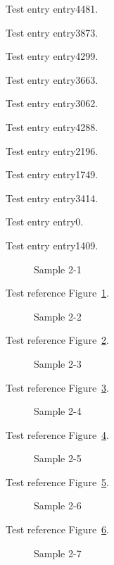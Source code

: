 Test entry \gls{entry4481}.

Test entry \gls{entry3873}.

Test entry \gls{entry4299}.

Test entry \gls{entry3663}.

Test entry \gls{entry3062}.

Test entry \gls{entry4288}.

Test entry \gls{entry2196}.

Test entry \gls{entry1749}.

Test entry \gls{entry3414}.

Test entry \gls{entry0}.

Test entry \gls{entry1409}.

\begin{figure}[tbhp]
\caption{Sample 2-1}
\label{fig:sample-2-1}
\end{figure}

Test reference Figure~\ref{fig:sample-2-1}.

\begin{figure}[tbhp]
\caption{Sample 2-2}
\label{fig:sample-2-2}
\end{figure}

Test reference Figure~\ref{fig:sample-2-2}.

\begin{figure}[tbhp]
\caption{Sample 2-3}
\label{fig:sample-2-3}
\end{figure}

Test reference Figure~\ref{fig:sample-2-3}.

\begin{figure}[tbhp]
\caption{Sample 2-4}
\label{fig:sample-2-4}
\end{figure}

Test reference Figure~\ref{fig:sample-2-4}.

\begin{figure}[tbhp]
\caption{Sample 2-5}
\label{fig:sample-2-5}
\end{figure}

Test reference Figure~\ref{fig:sample-2-5}.

\begin{figure}[tbhp]
\caption{Sample 2-6}
\label{fig:sample-2-6}
\end{figure}

Test reference Figure~\ref{fig:sample-2-6}.

\begin{figure}[tbhp]
\caption{Sample 2-7}
\label{fig:sample-2-7}
\end{figure}

